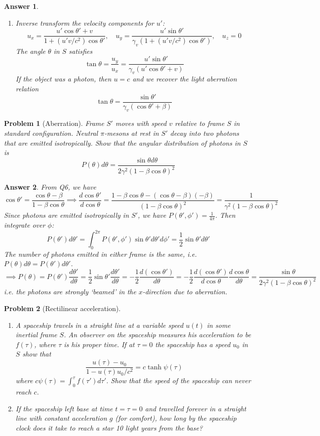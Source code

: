 \documentclass[a4paper]{article}
\theoremstyle{new2}
\newtheorem{ans}{Answer}[section]
\theoremstyle{new}
\newtheorem{qns}{Problem}[section]
\begin{document}
\begin{ans}
\begin{enumerate}[label=(\alph*)]
where the time coordinate in frame $S$ has to be $ct$. The back and the front both moves at speed $v$, as expected. The angle in frame $S$ thus satisfy
$$\tan\theta=\frac{\ell_0\sin\theta'}{\ell_0\cos\theta'/\gamma}=\gamma\tan\theta'$$
\item Inverse transform the velocity components for $u'$:
$$u_x=\frac{u'\cos\theta'+v}{1+(u'v/c^2)\cos\theta'},\quad u_y=\frac{u'\sin\theta'}{\gamma_v(1+(u'v/c^2)\cos\theta')},\quad u_z=0$$
The angle $\theta$ in $S$ satisfies
$$\tan\theta=\frac{u_y}{u_x}=\frac{u'\sin\theta'}{\gamma_v(u'\cos\theta'+v)}$$
If the object was a photon, then $u=c$ and we recover the light aberration relation
$$\tan\theta=\frac{\sin\theta'}{\gamma_v(\cos\theta'+\beta)}$$
\end{enumerate}
\end{ans}
\newpage
\begin{qns}[Aberration]
Frame $S'$ moves with speed $v$ relative to frame $S$ in standard configuration. Neutral $\pi$-mesons at rest in $S'$ decay into two photons that are emitted isotropically. Show that the angular distribution of photons in $S$ is
$$P(\theta)d\theta=\frac{\sin\theta d\theta}{2\gamma^2(1-\beta\cos\theta)^2}$$
\end{qns}
\begin{ans}
From Q6, we have 
$$\cos\theta'=\frac{\cos\theta-\beta}{1-\beta\cos\theta}\implies\frac{d\cos\theta'}{d\cos\theta}=\frac{1-\beta\cos\theta-(\cos\theta-\beta)(-\beta)}{(1-\beta\cos\theta)^2}=\frac{1}{\gamma^2(1-\beta\cos\theta)^2}$$
Since photons are emitted isotropically in $S'$, we have $P(\theta',\phi')=\frac{1}{4\pi}$. Then integrate over $\phi$:
$$P(\theta')d\theta'=\int_0^{2\pi}P(\theta',\phi')\sin\theta'd\theta'd\phi'=\frac{1}{2}\sin\theta'd\theta'$$
The number of photons emitted in either frame is the same, i.e. $P(\theta)d\theta=P(\theta')d\theta'$.
$$\implies P(\theta)=P(\theta')\frac{d\theta'}{d\theta}=\frac{1}{2}\sin\theta'\frac{d\theta'}{d\theta}=-\frac{1}{2}\frac{d(\cos\theta')}{d\theta}=-\frac{1}{2}\frac{d(\cos\theta')}{d\cos\theta}\frac{d\cos\theta}{d\theta}=\frac{\sin\theta}{2\gamma^2(1-\beta\cos\theta)^2}$$
i.e. the photons are strongly `beamed' in the $x$-direction due to aberration.
\end{ans}
\begin{qns}[Rectilinear acceleration]\leavevmode
\begin{enumerate}[label=(\alph*)]
\item A spaceship travels in a straight line at a variable speed $u(t)$ in some inertial frame $S$. An observer on the spaceship measures his acceleration to be $f(\tau)$, where $\tau$ is his proper time. If at $\tau=0$ the spaceship has a speed $u_0$ in $S$ show that
$$\frac{u(\tau)-u_0}{1-u(\tau)u_0/c^2}=c\tanh\psi(\tau)$$
where $c\psi(\tau)=\int_0^\tau f(\tau')d\tau'$. Show that the speed of the spaceship can never reach $c$.
\item If the spaceship left base at time $t=\tau=0$ and travelled forever in a straight line with constant acceleration $g$ (for comfort), how long by the spaceship clock does it take to reach a star 10 light years from the base?
\end{enumerate}
\end{qns}
\end{document}
